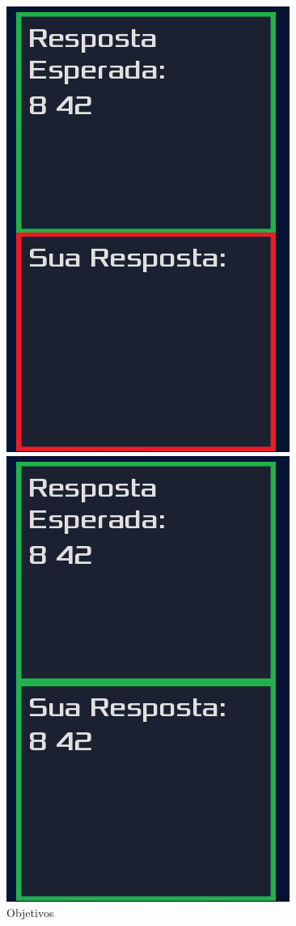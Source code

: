 \begin{figure}
    \centering
    \begin{minipage}{.4\textwidth}
      \centering
      \includegraphics[scale=0.3]{../figuras/saida.png}
    \end{minipage}%
    \begin{minipage}{.4\textwidth}
      \centering
      \includegraphics[scale=0.3]{../figuras/objetivo_alcancado.png}
    \end{minipage}
    \caption{Objetivos}
\end{figure}

